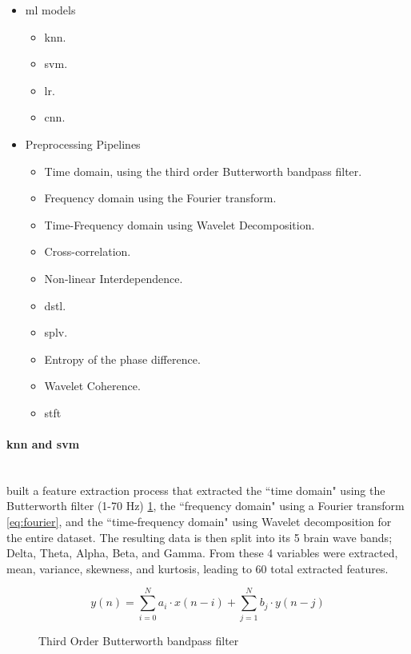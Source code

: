 \documentclass[12pt]{article}
\begin{document}
\begin{itemize}
	\item \acrfull{ml} models
	\begin{itemize}
	\item \acrfull{knn}.
	\item \acrfull{svm}.
	\item \acrfull{lr}.
	\item \acrfull{cnn}.
	\end{itemize}
	\item Preprocessing Pipelines
	\begin{itemize}
	\item Time domain, using the third order Butterworth bandpass filter.
	\item Frequency domain using the Fourier transform.
	\item Time-Frequency domain using Wavelet Decomposition.
	\item Cross-correlation.
	\item Non-linear Interdependence.
	\item \acrfull{dstl}.
	\item \acrfull{splv}.
	\item Entropy of the phase difference.
	\item Wavelet Coherence.
	\item \acrfull{stft}
	\end{itemize}
\end{itemize}

\paragraph{\acrfull{knn} and \acrfull{svm}}\mbox{}\\

\cite{savadkoohi2020machine} built a feature extraction process that extracted the ``time domain" using the Butterworth filter (1-70 Hz) \ref{eq:butterworth}, the ``frequency domain" using a Fourier transform  \ref{eq:fourier}, and the ``time-frequency domain" using Wavelet decomposition for the entire dataset. The resulting data is then split into its 5 brain wave bands; Delta, Theta, Alpha, Beta, and Gamma. From these 4 variables were extracted, mean, variance, skewness, and kurtosis, leading to 60 total extracted features. 

\begin{figure}[H]
\[ y(n) = \sum_{i=0}^{N} a_i \cdot x(n - i) + \sum_{j=1}^{N} b_j \cdot y(n - j) \]
\caption{Third Order Butterworth bandpass filter}
\label{eq:butterworth}
\end{figure}
\end{document}
